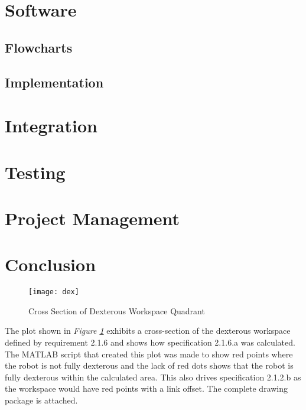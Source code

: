 \section{Software}
\subsection*{Flowcharts}

\subsection*{Implementation}

\section*{Integration}

\section{Testing}

\section{Project Management}

\section{Conclusion}


\nocite{*}

\raggedright
\titlespacing*{\chapter}{0pt}{-10pt}{40pt}
\newpage
\newpage
\appendix
\renewcommand\thesection{\Roman{section}}
\renewcommand\thesubsection{\roman{subsection}}
\label{sec:app}
\begin{figure}[htp]
  \centering
  \texttt{[image: dex]}
  \caption{Cross Section of Dexterous Workspace Quadrant}
  \label{fig:dex2}
\end{figure}
The plot shown in \emph{Figure \ref{fig:dex2}} exhibits a cross-section of the dexterous workspace defined by requirement 2.1.6 and shows how specification 2.1.6.a was calculated. The MATLAB script that created this plot was made to show red points where the robot is not fully dexterous and the lack of red dots shows that the robot is fully dexterous within the calculated area. This also drives specification 2.1.2.b as the workspace would have red points with a link offset.\newpage
{}
The complete drawing package is attached.



\vspace{10ex}

